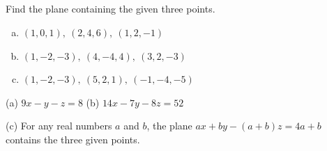 \subsection*{\Procedural}

\begin{question}
Find the plane containing the given three points.
\begin{enumerate}[(a)]
\item
$(1,0,1),\ (2,4,6),\ (1,2,-1)$
\item
$(1,-2,-3),\ (4,-4,4),\ (3,2,-3)$
\item
$(1,-2,-3),\ (5,2,1),\ (-1,-4,-5)$ 
\end{enumerate}
\end{question}

%

\begin{answer}
(a) $9x-y-z=8$ \qquad
(b) $14x-7y-8z=52$ 

(c) For any real numbers $a$ and $b$, the plane  
$ax+by-(a+b)z=4a+b$ contains the three given points. 

\end{answer}

